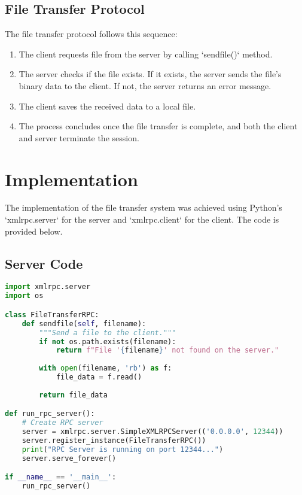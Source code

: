 \documentclass[a4paper,12pt]{article}
\begin{document}
\subsection{File Transfer Protocol}
The file transfer protocol follows this sequence:
\begin{enumerate}
    \item The client requests file from the server by calling `sendfile()` method.
    \item The server checks if the file exists. If it exists, the server sends the file's binary data to the client. If not, the server returns an error message.
    \item The client saves the received data to a local file.
    \item The process concludes once the file transfer is complete, and both the client and server terminate the session.
\end{enumerate}

\section{Implementation}
The implementation of the file transfer system was achieved using Python's `xmlrpc.server` for the server and `xmlrpc.client` for the client. The code is provided below.

\subsection{Server Code}

\begin{lstlisting}[language=Python, caption=Server Code]
import xmlrpc.server
import os

class FileTransferRPC:
    def sendfile(self, filename):
        """Send a file to the client."""
        if not os.path.exists(filename):
            return f"File '{filename}' not found on the server."
        
        with open(filename, 'rb') as f:
            file_data = f.read()
        
        return file_data

def run_rpc_server():
    # Create RPC server
    server = xmlrpc.server.SimpleXMLRPCServer(('0.0.0.0', 12344))
    server.register_instance(FileTransferRPC())
    print("RPC Server is running on port 12344...")
    server.serve_forever()

if __name__ == '__main__':
    run_rpc_server()
\end{lstlisting}
\end{document}
